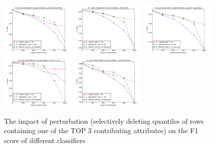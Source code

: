 \documentclass{llncs}
\begin{document}
\begin{figure}[H]
	\begin{center}
		\includegraphics[width=0.32\textwidth]{figures/results/perturb_gradient_boost}
		\includegraphics[width=0.32\textwidth]{figures/results/perturb_linear_svc}
		\includegraphics[width=0.32\textwidth]{figures/results/perturb_logistic_regression}
		\includegraphics[width=0.32\textwidth]{figures/results/perturb_onevsrest_bagging}
		\includegraphics[width=0.32\textwidth]{figures/results/perturb_random_forest}
		\caption{The impact of perturbation (selectively deleting quantiles of rows containing one of the TOP 3 contributing attributes) on the F1 score of different classifiers}
		\label{fig:adult_results_perturbation_top}
	\end{center}
\end{figure}
\end{document}
